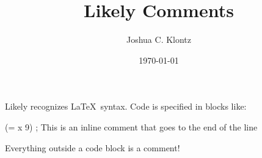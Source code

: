 \documentclass{article}
\title{Likely Comments}
\author{Joshua C. Klontz}
\date{\today}
\newenvironment{likely}
{ \verbatim }
{ \endverbatim }
\begin{document}
\maketitle

Likely recognizes \LaTeX\ syntax.
Code is specified in blocks like:

\begin{likely}
  (= x 9)
  ; This is an inline comment that goes to the end of the line
\end{likely}

Everything outside a code block is a comment!
\end{document}
